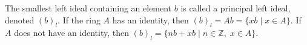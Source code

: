 The smallest left ideal containing an element $b$ is called a principal left ideal, denoted $(b)_l$. If the ring $A$ has an identity, then $(b)_l = Ab = \{ xb \mid x \in A \}$. If $A$ does not have an identity, then $(b)_l = \{ nb + xb \mid n \in \mathbb{Z},\; x \in A \}$.